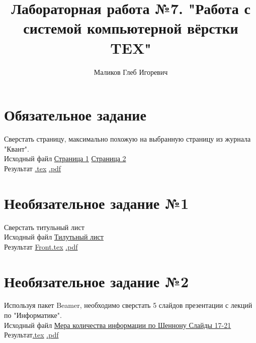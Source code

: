 \documentclass[10pt,a4paper,twopage]{article}
\title{Лабораторная работа №7. "Работа с системой компьютерной вёрстки TEX"}
\author{Маликов Глеб Игоревич}
\begin{document}
\maketitle

\section{Обязательное задание}
Сверстать страницу, максимально похожую на выбранную страницу из журнала "Квант".\\
Исходный файл \href{run:./source/Article1.gif}{Страница 1} \href{run:./source/Article1.gif}{Страница 2}\\
Результат \href{run:./Article.tex}{.tex} \href{run:./Article.pdf}{.pdf}

\section{Необязательное задание №1}
Сверстать титульный лист\\
Исходный файл \href{run:./source/Front.gif}{Тилутьный лист}\\
Результат \href{run:./Front.tex}{Front.tex} \href{run:./Front.pdf}{.pdf}


\section{Необязательное задание №2}
Используя пакет Beamer, необходимо сверстать 5 слайдов презентации с лекций по "Информатике".\\
Исходный файл \href{run:./source/Lecture.pdf#page=17}{Мера количества информации по Шеннону Слайды 17-21}\\
Результат\href{run:./Beamer.tex}{.tex} \href{run:./Beamer.pdf}{.pdf}

\clearpage

\clearpage

\end{document}
